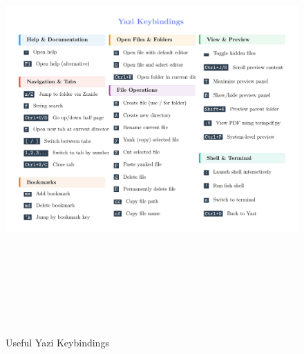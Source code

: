 \documentclass[
  letterpaper,
  DIV=11,
  numbers=noendperiod]{scrartcl}
\begin{document}
\begin{figure}[H]

{\centering \includegraphics[width=1\textwidth,height=6.45833in]{cheatsheet/yazi.pdf}

}

\caption{Useful Yazi Keybindings}

\end{figure}%
\end{document}
